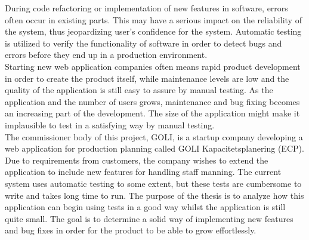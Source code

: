 During code refactoring or implementation of new features in software,
errors often occur in existing parts. This may have a serious impact on
the reliability of the system, thus jeopardizing user's confidence for
the system. Automatic testing is utilized to verify the functionality of
software in order to detect bugs and errors before they end up in a
production environment.\\

Starting new web application companies often means rapid product
development in order to create the product itself, while maintenance
levels are low and the quality of the application is still easy to
assure by manual testing. As the application and the number of users
grows, maintenance and bug fixing becomes an increasing part of the
development. The size of the application might make it implausible to
test in a satisfying way by manual testing.\\

The commissioner body of this project, GOLI, is a startup company
developing a web application for production planning called GOLI
Kapacitetsplanering (ECP). Due to requirements from customers, the
company wishes to extend the application to include new features for
handling staff manning. The current system uses automatic testing to
some extent, but these tests are cumbersome to write and takes long time
to run. The purpose of the thesis is to analyze how this application can
begin using tests in a good way whilst the application is still quite
small. The goal is to determine a solid way of implementing new features
and bug fixes in order for the product to be able to grow
effortlessly.\\
